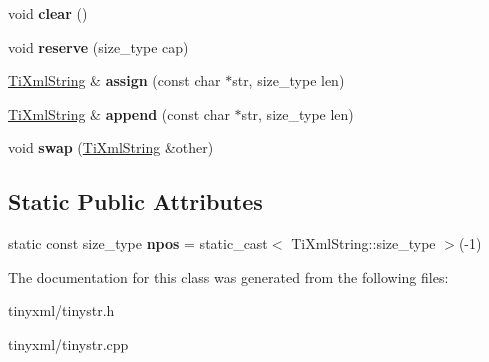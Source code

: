 \begin{DoxyCompactItemize}
\item 
\hypertarget{class_ti_xml_string_ab20e06e4c666abf3bdbfb3a1191d4888}{void {\bfseries clear} ()}\label{class_ti_xml_string_ab20e06e4c666abf3bdbfb3a1191d4888}

\item 
\hypertarget{class_ti_xml_string_a88ecf9f0f00cb5c67b6b637958d7049c}{void {\bfseries reserve} (size\-\_\-type cap)}\label{class_ti_xml_string_a88ecf9f0f00cb5c67b6b637958d7049c}

\item 
\hypertarget{class_ti_xml_string_ac72f3d9149b7812c1e6c59402014d0d5}{\hyperlink{class_ti_xml_string}{\-Ti\-Xml\-String} \& {\bfseries assign} (const char $\ast$str, size\-\_\-type len)}\label{class_ti_xml_string_ac72f3d9149b7812c1e6c59402014d0d5}

\item 
\hypertarget{class_ti_xml_string_ad44b21700d2ec24a511367b222b643fb}{\hyperlink{class_ti_xml_string}{\-Ti\-Xml\-String} \& {\bfseries append} (const char $\ast$str, size\-\_\-type len)}\label{class_ti_xml_string_ad44b21700d2ec24a511367b222b643fb}

\item 
\hypertarget{class_ti_xml_string_aa392cbc180752a79f007f4f9280c7762}{void {\bfseries swap} (\hyperlink{class_ti_xml_string}{\-Ti\-Xml\-String} \&other)}\label{class_ti_xml_string_aa392cbc180752a79f007f4f9280c7762}

\end{DoxyCompactItemize}
\subsection*{\-Static \-Public \-Attributes}
\begin{DoxyCompactItemize}
\item 
\hypertarget{class_ti_xml_string_a8f4422d227088dc7bec96f479b275d0a}{static const size\-\_\-type {\bfseries npos} = static\-\_\-cast$<$ \-Ti\-Xml\-String\-::size\-\_\-type $>$(-\/1)}\label{class_ti_xml_string_a8f4422d227088dc7bec96f479b275d0a}

\end{DoxyCompactItemize}


\-The documentation for this class was generated from the following files\-:\begin{DoxyCompactItemize}
\item 
tinyxml/tinystr.\-h\item 
tinyxml/tinystr.\-cpp\end{DoxyCompactItemize}
